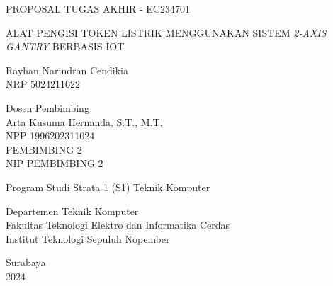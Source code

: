 \begin{large}
  PROPOSAL TUGAS AKHIR - EC234701
\end{large}

\vspace{\fill}

\begin{spacing}{1.5}
  \begin{Large}
    ALAT PENGISI TOKEN LISTRIK MENGGUNAKAN SISTEM \emph{2-AXIS GANTRY}
    BERBASIS IOT
  \end{Large}
\end{spacing}

\vspace{\fill}

\begin{large}
  Rayhan Narindran Cendikia \\
  \textmd{NRP 5024211022}
\end{large}

\vspace{\fill}

\begin{large}
  \textmd{Dosen Pembimbing} \\
  Arta Kusuma Hernanda, S.T., M.T. \\
  \textmd{NPP 1996202311024} \\
  PEMBIMBING 2 \\
  \textmd{NIP PEMBIMBING 2}
\end{large}

\vspace{\fill}

Program Studi Strata 1 (S1) Teknik Komputer \\

\mdseries

Departemen Teknik Komputer \\
Fakultas Teknologi Elektro dan Informatika Cerdas \\
Institut Teknologi Sepuluh Nopember

Surabaya \\
2024
